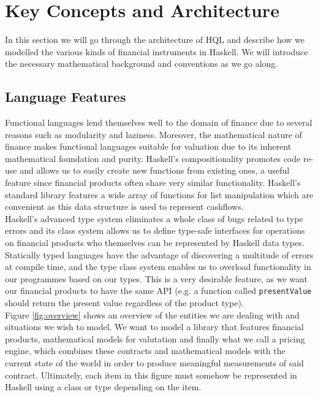 \chapter{Key Concepts and Architecture}

In this section we will go through the architecture of HQL and describe how we
modelled the various kinds of financial instruments in Haskell. We will introduce
the necessary mathematical background and conventions as we go along.

\section{Language Features}

Functional languages lend themselves well to the domain of finance due
to several reasons such as modularity\cite{hughes:matters-cj} and 
laziness\cite{composingcontracts}. Moreover, the mathematical nature
of finance makes functional languages suitable for valuation due to its
inherent mathematical foundation and purity. Haskell's compositionality
promotes code re-use and allows us to easily create new functions from
existing ones, a useful feature since financial products often share
 very similar functionality. Haskell's standard library features a wide array of
functions for list manipulation which are convenient as this data structure
is used to represent cashflows.\\

Haskell's advanced type system eliminates a whole class of bugs related to 
type errors and its 
class system allows us to define type-safe interfaces for operations on 
financial products who themselves can be represented by Haskell data types. 
Statically typed languages have the advantage of discovering a multitude of
errors at compile time, and the type class system enables us to overload 
functionality in our programmes based on our types. This is a very desirable
feature, as we want our financial products to have the same API (e.g. a function 
called \texttt{presentValue} should return the present value regardless of the
product type).\\

Figure \ref{fig:overview} shows an overview of the entities we are dealing with
and situations we wish to model. We want to model a library that features 
financial products, mathematical models for valutation and finally what we 
call a pricing engine, which combines these contracts and mathematical models 
with the current state of the world in order to produce meaningful measurements 
of said contract. Ultimately, each item in this figure must somehow
be represented in Haskell using a class or type depending on the item.\\

